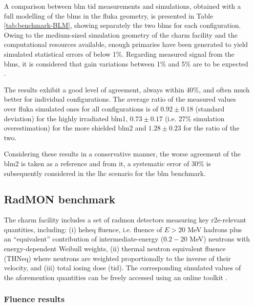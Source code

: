 \documentclass[encoding=utf8,british]{tumphthesis}
\begin{document}
A comparison between \acrshort{blm} \acrshort{tid} measurements and simulations, obtained with a full modelling of the \acrshort{blm}s in the \acrshort{fluka} geometry, is presented in Table \ref{tab:benchmark-BLM}, showing separately the two \acrshort{blm}s for each configuration. Owing to the medium-sized simulation geometry of the \acrshort{charm} facility and the computational resources available, enough primaries have been generated to yield simulated statistical errors of below 1\%. Regarding measured signal from the \acrshort{blm}s, it is considered that gain variations between 1\% and 5\% are to be expected \cite{thesis-Sara-Morales}.

The results exhibit a good level of agreement, always within 40\%, and often much better for individual configurations. The average ratio of the measured values over \acrshort{fluka} simulated ones for all configurations is of $0.92\pm0.18$ (standard deviation) for the highly irradiated \acrshort{blm}1, $0.73\pm0.17$ (i.e. 27\% simulation overestimation) for the more shielded \acrshort{blm}2 and $1.28\pm0.23$ for the ratio of the two. 

Considering these results in a conservative manner, the worse agreement of the \acrshort{blm}2 is taken as a reference and from it, a systematic error of 30\% is subsequently considered in the \acrshort{lhc} scenario for the \acrshort{blm} benchmark.

\subsection{RadMON benchmark}
\label{subsection:CHARM-benchmark-RadMON}
The \acrshort{charm} facility includes a set of \acrshort{radmon} detectors measuring key \acrshort{r2e}-relevant quantities, including: (i)  \acrshort{heh}eq fluence, i.e. fluence of $E > 20$ MeV hadrons plus an “equivalent” contribution of intermediate-energy ($0.2- 20$ MeV) neutrons with energy-dependent Weibull weights, (ii) thermal neutron equivalent fluence (THNeq) where neutrons are weighted proportionally to the inverse of their velocity, and (iii) total iosing dose (\acrshort{tid}). The corresponding simulated values of the aforemention quantities can be freely accessed using an online toolkit \cite{CHARM:online-toolkit}.

\subsubsection{Fluence results}
\end{document}
